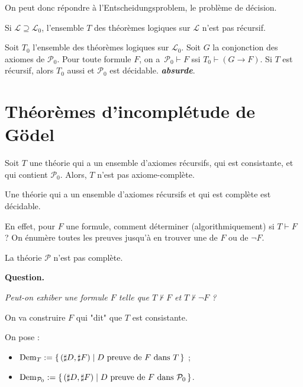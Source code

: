 \documentclass[./main]{subfiles}
\begin{document}
 On peut donc répondre à l'Entscheidungsproblem, le problème de décision.

 \begin{thm}
   Si $\mathcal{L} \supseteq \mathcal{L}_0$, l'ensemble $T$ des théorèmes logiques sur $\mathcal{L}$ n'est pas récursif.
 \end{thm}
 \begin{prv}
   Soit $T_0$ l'ensemble des théorèmes logiques sur $\mathcal{L}_0$.
   Soit $G$ la conjonction des axiomes de $\mathcal{P}_0$.
   Pour toute formule $F$, on a~$\mathcal{P}_0 \vdash F$ ssi $T_0 \vdash (G \to F)$.
   Si $T$ est récursif, alors $T_0$ aussi et $\mathcal{P}_0$ est décidable. \textit{\textbf{absurde}}.
 \end{prv}

 \section{Théorèmes d'incomplétude de Gödel}

 \begin{thm}
   Soit $T$ une théorie qui a un ensemble d'axiomes récursifs, qui est consistante, et qui contient $\mathcal{P}_0$. Alors, $T$ n'est pas axiome-complète.
 \end{thm}
 \begin{prv}
   Une théorie qui a un ensemble d'axiomes récursifs et qui est complète est décidable.

   En effet, pour $F$ une formule, comment déterminer (algorithmiquement) si $T \vdash F$ ?
   On énumère toutes les preuves jusqu'à en trouver une de $F$ ou de $\lnot F$.
 \end{prv}

 \begin{crlr}
   La théorie $\mathcal{P}$ n'est pas complète.
 \end{crlr}


 \textbf{Question.} 
 \begin{center}
   \textit{Peut-on exhiber une formule $F$ telle que $T \not\vdash F$ et $T \not\vdash \lnot F$ ?}
 \end{center}

 On va construire $F$ qui "dit" que $T$ est consistante.

 \begin{defn}
   On pose :
   \begin{itemize}
     \item $\mathrm{Dem}_T := \mleft\{\,(\sharp D, \sharp F) \;\middle|\; \text{$D$ preuve de $F$ dans $T$}\,\mright\}$ ;
     \item $\mathrm{Dem}_{\mathcal{P}_0} := \mleft\{\,(\sharp D, \sharp F) \;\middle|\; \text{$D$ preuve de $F$ dans $\mathcal{P}_0$}\,\mright\}$.
   \end{itemize}
 \end{defn}
\end{document}
